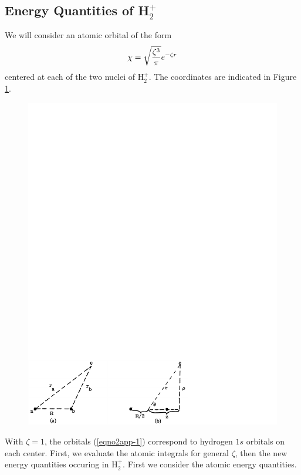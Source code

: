 \subsection{Energy Quantities of H$^+_2$}
\label{appendix-a}
    
We will consider an atomic orbital of the form
\begin{equation}
\chi = \sqrt{{\zeta^3 \over \pi}} e^{- \zeta r}
\label{eqno2app-1}
\end{equation}
centered at each of the two nuclei of H$^+_2$. The coordinates are
indicated in Figure \ref{fig2app-1}.

\begin{figure}
\includegraphics[scale=0.75]{fig2-34}
\caption{}
\label{fig2app-1}
\end{figure}

\noindent
With $\zeta = 1$, the orbitals (\ref{eqno2app-1}) correspond to
hydrogen $1s$ orbitals on each center. First, we evaluate the atomic
integrals for general $\zeta$, then the new energy quantities occuring
in H$^+_2$. First we consider the atomic energy quantities.

